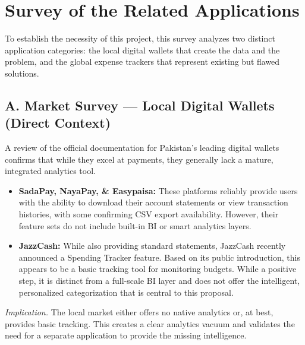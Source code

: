 \documentclass[11pt,a4paper]{report}
\begin{document}
\section{Survey of the Related Applications}
To establish the necessity of this project, this survey analyzes two distinct application categories: the local digital wallets that create the data and the problem, and the global expense trackers that represent existing but flawed solutions.

\subsection{A. Market Survey — Local Digital Wallets (Direct Context)}
A review of the official documentation for Pakistan's leading digital wallets confirms that while they excel at payments, they generally lack a mature, integrated analytics tool.
\begin{itemize}
	\item \textbf{SadaPay, NayaPay, \& Easypaisa:} These platforms reliably provide users with the ability to download their account statements or view transaction histories, with some confirming CSV export availability. However, their feature sets do not include built-in BI or smart analytics layers.
	\item \textbf{JazzCash:} While also providing standard statements, JazzCash recently announced a Spending Tracker feature. Based on its public introduction, this appears to be a basic tracking tool for monitoring budgets. While a positive step, it is distinct from a full-scale BI layer and does not offer the intelligent, personalized categorization that is central to this proposal.
\end{itemize}
\textit{Implication.} The local market either offers no native analytics or, at best, provides basic tracking. This creates a clear analytics vacuum and validates the need for a separate application to provide the missing intelligence.
\end{document}
